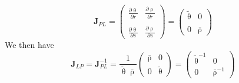 \[
{\bm J}_{PL}=
\left(
\begin{array}{cc}
\frac{\partial \uptheta}{\partial r}  & 
\frac{\partial \uprho}{\partial r}  \\ \\
\frac{\partial \uptheta}{\partial s}  & 
\frac{\partial \uprho}{\partial s}
\end{array}
\right)
=
\left(
\begin{array}{cc}
\tilde{\uptheta}  &  0 \\\\
0 & \bar{\uprho}
\end{array}
\right)
\]
We then  have
\begin{equation}
{\bm J}_{LP}={\bm J}_{PL}^{-1} 
= \frac{1}{ \tilde{\uptheta} \bar{\uprho} } 
\left(
\begin{array}{cc}
\bar{\uprho}& 0 \\
0 &  \tilde{\uptheta}
\end{array}
\right)
=
\left(
\begin{array}{cc}
\tilde{\uptheta}^{-1}& 0 \\
0 & \bar{\uprho} ^{-1}
\end{array}
\right)
\end{equation}


